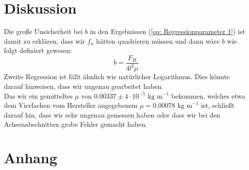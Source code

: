 \documentclass[bibliography=totocnumbered]{scrartcl}
\begin{document}
	
	\section{Diskussion}
	Die große Unsicherheit bei $ b $ in den Ergebnissen (\ref{eq: Regressionparameter 1}) ist damit zu erklären, dass wir $ f_{n} $ hätten quadrieren müssen und dann wäre $ b $ wie folgt definiert gewesen:
	\begin{equation}
		b=\dfrac{F_{H}}{4l^{2}\mu}
	\end{equation}
	Zweite Regression ist fällt ähnlich wie natürlicher Logarithmus. Dies könnte darauf hinweisen, dass wir ungenau gearbeitet haben.\\
	Das wir ein gemitteltes $ \mu $ von $ 0.00337\pm 4\cdot 10^{-5}\text{ kg m}^{-1} $ bekommen, welches etwa dem Vierfachen vom Hersteller angegebenem $ \mu = 0.00078 \text{ kg m}^{-1}$ ist, schließt darauf hin, dass wir sehr ungenau gemessen haben oder dass wir bei den Achsenabschnitten grobe Fehler gemacht haben.
	
	
	
	\newpage
    \appendix
	\section{Anhang}
	
	
\end{document}
